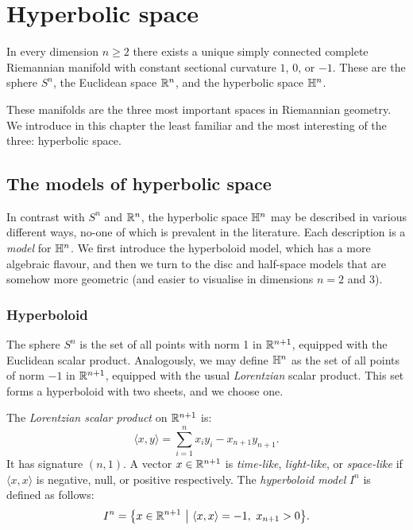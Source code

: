 \chapter{Hyperbolic space} \label{spazio:chapter} \label{space:chapter}
In every dimension $n\geqslant 2$ there exists a unique simply connected complete Riemannian manifold with constant sectional curvature $1$, $0$, or $-1$. These are the sphere $S^n$, the Euclidean space $\mathbb{R}^n$, and the hyperbolic space $\mathbb{H}^n$. 

These manifolds are the three most important spaces in Riemannian geometry. We introduce in this chapter the least familiar and the most interesting of the three: hyperbolic space. 

\section{The models of hyperbolic space}
In contrast with $S^n$ and $\mathbb{R}^n$, the hyperbolic space $\mathbb{H}^n$ may be described in various different ways, no-one of which is prevalent in the literature. Each description is a \emph{model} for $\mathbb{H}^n$. We first introduce the hyperboloid model, which has a more algebraic flavour, and then we turn to the disc and half-space models that are somehow more geometric (and easier to visualise in dimensions $n=2$ and $3$).

\subsection{Hyperboloid}
The sphere $S^n$ is the set of all points with norm 1 in $\mathbb{R}^{n+1}$, equipped with the Euclidean scalar product. Analogously, we may define $\mathbb{H}^n$ as the set of all points of norm $-1$ in $\mathbb{R}^{n+1}$, equipped with the usual \emph{Lorentzian} scalar product. This set forms a hyperboloid with two sheets, and we choose one. 

\begin{defn} The \emph{Lorentzian scalar product} on $\mathbb{R}^{n+1}$ is:
$$\langle x, y \rangle = \sum_{i=1}^n x_iy_i - x_{n+1}y_{n+1}.$$
It has signature $(n,1)$. A vector $x \in \mathbb{R}^{n+1}$ is \emph{time-like}, \emph{light-like}, or \emph{space-like} if $\langle x, x \rangle$ is negative, null, or positive respectively.
The \emph{hyperboloid model} $I^n$ is defined as follows:
  
$$I^n = \big\{x \in \mathbb{R}^{n+1}\ \big| \ \langle x, x \rangle = -1, \ x_{n+1} > 0 \big\}.$$
\end{defn}

